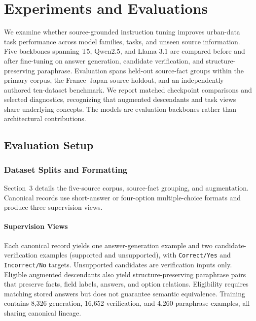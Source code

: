 \documentclass[a4paper,fleqn]{cas-sc}
\begin{document}
\section{Experiments and Evaluations}
We examine whether source-grounded instruction tuning improves urban-data task performance across model families, tasks, and unseen source information. Five backbones spanning T5, Qwen2.5, and Llama 3.1 are compared before and after fine-tuning on answer generation, candidate verification, and structure-preserving paraphrase. Evaluation spans held-out source-fact groups within the primary corpus, the France--Japan source holdout, and an independently authored ten-dataset benchmark. We report matched checkpoint comparisons and selected diagnostics, recognizing that augmented descendants and task views share underlying concepts. The models are evaluation backbones rather than architectural contributions.

\subsection{Evaluation Setup}

\subsubsection{Dataset Splits and Formatting}

Section~3 details the five-source corpus, source-fact grouping, and augmentation. Canonical records use short-answer or four-option multiple-choice formats and produce three supervision views.

\paragraph{Supervision Views}
Each canonical record yields one answer-generation example and two candidate-verification examples (supported and unsupported), with \texttt{Correct/Yes} and \texttt{Incorrect/No} targets. Unsupported candidates are verification inputs only. Eligible augmented descendants also yield structure-preserving paraphrase pairs that preserve facts, field labels, answers, and option relations. Eligibility requires matching stored answers but does not guarantee semantic equivalence. Training contains 8,326 generation, 16,652 verification, and 4,260 paraphrase examples, all sharing canonical lineage.
\end{document}
